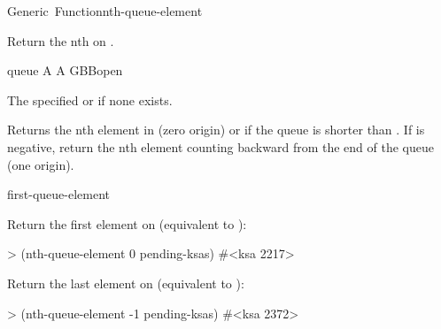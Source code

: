 \documentclass[10pt,twoside,english,pdftex]{article}
\begin{document}
\begin{functiondoc}{Generic~Function}{nth-queue-element}{ 
    \returns{} }
%

\fnsyntax

\fnpurpose Return the nth  on .

\fnmethods
{}

\fnpackage {}

\fnmodule {}

\fnargs
\begin{args}{queue}
\arg[n] A 
\arg[queue] A GBBopen 
\end{args}

\fnreturns The specified  or \nil{} if none exists.
  
\fndescription Returns the nth element in  (zero origin) or
\nil{} if the queue is shorter than .  If  is negative,
return the nth element counting backward from the end of the queue (one
origin).

\begin{alsos}{first-queue-element}
\end{alsos}

%
%
\fnexamples
Return the first element on  (equivalent to
\textbf{}):
%
\W\supp
\begin{example}
> (nth-queue-element 0 pending-ksas)
#<ksa 2217>
\end{example}
%
Return the last element on  (equivalent to
\textbf{}):
%
\W\supp\notpretop
\begin{example}
> (nth-queue-element -1 pending-ksas)
#<ksa 2372>
\end{example}

\end{functiondoc}

\end{document}
